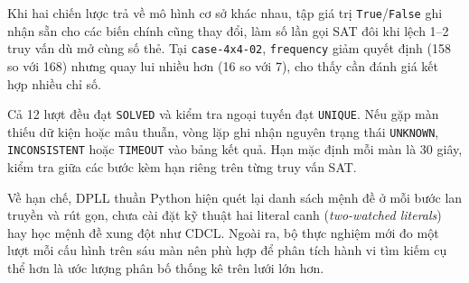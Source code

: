 Khi hai chiến lược trả về mô hình cơ sở khác nhau, tập giá trị \texttt{True}/\texttt{False} ghi nhận sẵn cho các biến chính cũng thay đổi, làm số lần gọi SAT đôi khi lệch 1--2 truy vấn dù mở cùng số thẻ. Tại \texttt{case-4x4-02}, \texttt{frequency} giảm quyết định (158 so với 168) nhưng quay lui nhiều hơn (16 so với 7), cho thấy cần đánh giá kết hợp nhiều chỉ số.

Cả 12 lượt đều đạt \texttt{SOLVED} và kiểm tra ngoại tuyến đạt \texttt{UNIQUE}. Nếu gặp màn thiếu dữ kiện hoặc mâu thuẫn, vòng lặp ghi nhận nguyên trạng thái \texttt{UNKNOWN}, \texttt{INCONSISTENT} hoặc \texttt{TIMEOUT} vào bảng kết quả. Hạn mặc định mỗi màn là 30 giây, kiểm tra giữa các bước kèm hạn riêng trên từng truy vấn SAT.

Về hạn chế, DPLL thuần Python hiện quét lại danh sách mệnh đề ở mỗi bước lan truyền và rút gọn, chưa cài đặt kỹ thuật hai literal canh (\emph{two-watched literals}) hay học mệnh đề xung đột như CDCL. Ngoài ra, bộ thực nghiệm mới đo một lượt mỗi cấu hình trên sáu màn nên phù hợp để phân tích hành vi tìm kiếm cụ thể hơn là ước lượng phân bố thống kê trên lưới lớn hơn.

\par\endgroup
